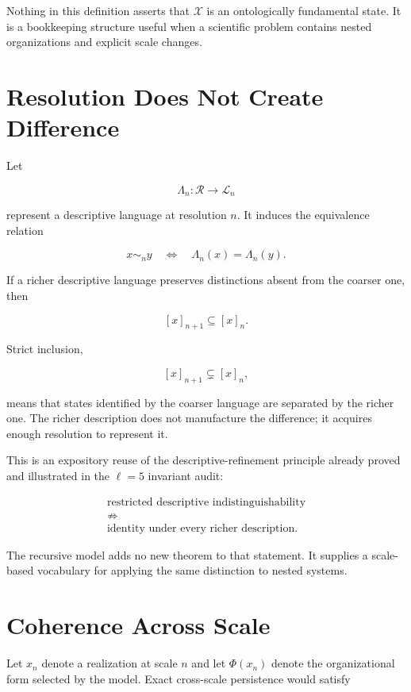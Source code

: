 Nothing in this definition asserts that $\mathcal X$ is an ontologically fundamental state. It is a bookkeeping structure useful when a scientific problem contains nested organizations and explicit scale changes.

\section{Resolution Does Not Create Difference}

Let

\[
\Lambda_n:\mathscr R\longrightarrow\mathcal L_n
\]

represent a descriptive language at resolution $n$. It induces the equivalence relation

\[
x\sim_n y
\quad\Longleftrightarrow\quad
\Lambda_n(x)=\Lambda_n(y).
\]

If a richer descriptive language preserves distinctions absent from the coarser one, then

\[
[x]_{n+1}\subseteq[x]_n.
\]

Strict inclusion,

\[
[x]_{n+1}\subsetneq[x]_n,
\]

means that states identified by the coarser language are separated by the richer one. The richer description does not manufacture the difference; it acquires enough resolution to represent it.

This is an expository reuse of the descriptive-refinement principle already proved and illustrated in the $\ell=5$ invariant audit:

\[
\begin{gathered}
\text{restricted descriptive indistinguishability}\\
\not\Rightarrow\\
\text{identity under every richer description}.
\end{gathered}
\]

The recursive model adds no new theorem to that statement. It supplies a scale-based vocabulary for applying the same distinction to nested systems.

\section{Coherence Across Scale}

Let $x_n$ denote a realization at scale $n$ and let $\Phi(x_n)$ denote the organizational form selected by the model. Exact cross-scale persistence would satisfy

